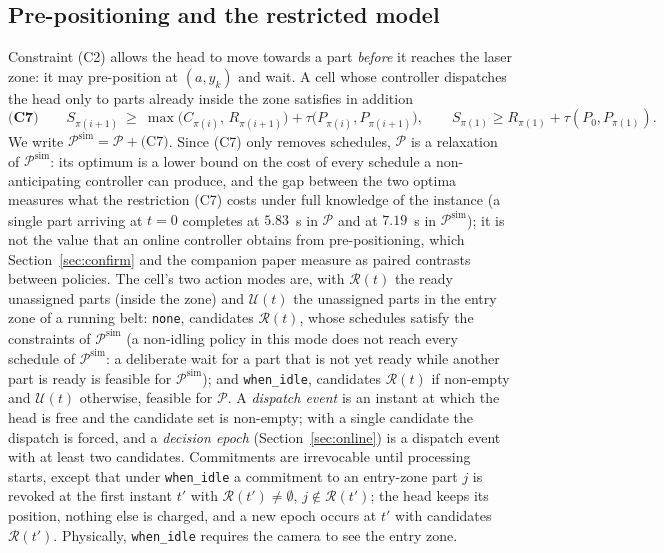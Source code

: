 \documentclass[11pt,a4paper]{article}
\theoremstyle{plain}
\theoremstyle{definition}
\theoremstyle{remark}
\newcommand{\Pb}{\mathcal{P}}
\newcommand{\Psim}{\Pb^{\mathrm{sim}}}
\begin{document}
\subsection{Pre-positioning and the restricted model}
Constraint (C2) allows the head to move towards a part \emph{before} it reaches the laser
zone: it may pre-position at $(a,y_k)$ and wait. A cell whose controller dispatches the
head only to parts already inside the zone satisfies in addition
\begin{equation}\label{eq:C7}
\textbf{(C7)}\qquad S_{\pi(i+1)}\ \ge\ \max\bigl(C_{\pi(i)},\,R_{\pi(i+1)}\bigr)+\tau\bigl(P_{\pi(i)},P_{\pi(i+1)}\bigr),
\qquad S_{\pi(1)}\ge R_{\pi(1)}+\tau(P_0,P_{\pi(1)}).
\end{equation}
We write $\Psim=\Pb+\text{(C7)}$. Since (C7) only removes schedules, $\Pb$ is a relaxation
of $\Psim$: its optimum is a lower bound on the cost of every schedule a non-anticipating
controller can produce, and the gap between the two optima measures what the restriction
(C7) costs under full knowledge of the instance (a single part arriving at $t=0$
completes at $5.83$~s in $\Pb$ and at $7.19$~s in $\Psim$); it is not the value that an online
controller obtains from pre-positioning, which Section~\ref{sec:confirm} and the companion
paper measure as paired contrasts between policies. The cell's two action modes
are, with $\mathcal R(t)$ the ready unassigned parts (inside the zone) and $\mathcal U(t)$
the unassigned parts in the entry zone of a running belt: \texttt{none}, candidates
$\mathcal R(t)$, whose schedules satisfy the constraints of $\Psim$ (a non-idling policy in
this mode does not reach every schedule of $\Psim$: a deliberate wait for a part that is
not yet ready while another part is ready is feasible for $\Psim$); and \texttt{when\_idle}, candidates $\mathcal R(t)$
if non-empty and $\mathcal U(t)$ otherwise, feasible for $\Pb$. A \emph{dispatch event} is an
instant at which the head is free and the candidate set is non-empty; with a single
candidate the dispatch is forced, and a \emph{decision epoch} (Section~\ref{sec:online})
is a dispatch event with at least two candidates. Commitments are
irrevocable until processing starts, except that under \texttt{when\_idle} a commitment to
an entry-zone part $j$ is revoked at the first instant $t'$ with $\mathcal R(t')\ne\emptyset$,
$j\notin\mathcal R(t')$; the head keeps its position, nothing else is charged, and a new
epoch occurs at $t'$ with candidates $\mathcal R(t')$. Physically, \texttt{when\_idle}
requires the camera to see the entry zone.
\end{document}
